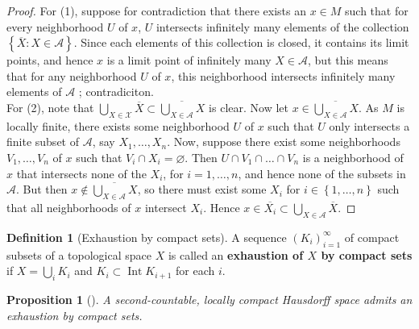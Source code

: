 \documentclass[reqno]{amsart}
\theoremstyle{plain}%
\newtheorem{proposition}[theorem]{Proposition}
\theoremstyle{definition}
\newtheorem{definition}[theorem]{Definition}
\theoremstyle{remark}
\DeclareMathOperator{\Int}{Int}
\begin{document}
    \begin{proof}
        For (1), suppose for contradiction that there
        exists an $x \in M$ such that for every neighborhood $U$ of $x$,
        $U$ intersects infinitely many elements of the collection
        $\left\{ \overline{X} \colon X \in \mathcal{A} \right\} $. Since
        each elements of this collection is closed, it contains its limit points,
        and hence $x$ is a limit point of infinitely many $X \in \mathcal{A}$, but
        this means that for any neighborhood  $U$ of $x$, this neighborhood
        intersects infinitely many elements of $\mathcal{A}$ ; contradiciton.\\
        \linebreak
        For (2), note that $\bigcup_{X \in \mathcal{X}} \overline{X}
        \subset \overline{\bigcup_{X \in \mathcal{A}} X}$ is clear.
        Now let $x \in \overline{\bigcup_{X \in \mathcal{A}} X}$.
        As $M$ is locally finite, there exists some neighborhood $U$ of $x$ such
        that $U$ only intersects a finite subset of $\mathcal{A}$, say
        $X_1, \ldots, X_n$. Now, suppose there exist some neighborhoods $V_1,
        \ldots,
        V_n$ of $x$ such that
        $V_i \cap X_i = \varnothing$. Then
        $U \cap V_1 \cap \ldots \cap V_n$ is a neighborhood of $x$ that intersects
        none of the $X_i$, for $i = 1,\ldots, n$, and hence none of the
        subsets in $\mathcal{A}$. But then
        $x \not\in \overline{\bigcup_{X \in \mathcal{A}} X}$, so there
        must exist some $X_i$ for $i \in \left\{ 1,\ldots,n \right\} $ such that
        all neighborhoods of  $x$ intersect $X_i$. Hence
        $x \in \overline{X_i} \subset \bigcup_{X \in \mathcal{A}} \overline{X}$.
    \end{proof}


    \begin{definition}[Exhaustion by compact sets]
        A sequence $\left( K_i \right)_{i=1}^{\infty}$ of compact subsets
        of a topological space $X$ is called an \textbf{exhaustion of $X$ by
        compact sets} if $X = \bigcup_{i} K_i$ and $K_i \subset 
        \Int K_{i+1}$ for each $i$.
    \end{definition}

    \begin{proposition}[]\label{lemma-exhaustion-by-compact-sets}
        A second-countable, locally compact Hausdorff space admits an exhaustion by
        compact sets.
    \end{proposition}
\end{document}
